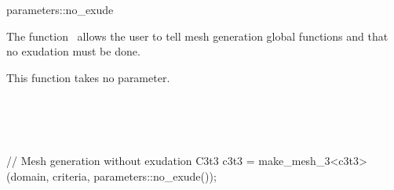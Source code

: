 \ccRefPageBegin


\begin{ccRefFunction}{parameters::no_exude}  %


\ccDefinition
  
The function \ccRefName\ allows the user to tell mesh generation global functions
 and  that no exudation must be done.



\ccParameters

This function takes no parameter.

\ccSeeAlso

 \\
 \\
 \\


\ccExample

\begin{ccExampleCode}
// Mesh generation without exudation
C3t3 c3t3 = make_mesh_3<c3t3>(domain, criteria, parameters::no_exude());
\end{ccExampleCode}


\end{ccRefFunction}

\ccRefPageEnd

